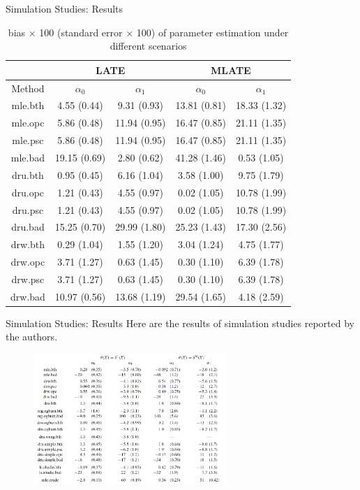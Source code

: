\documentclass[aspectratio=169,xcolor=dvipsnames]{beamer}
\begin{document}
\begin{frame}{Simulation Studies: Results}
\begin{table}
\footnotesize
\centering
\begin{tabular}[h]{c|cc|cc}
\toprule
    & \multicolumn{2}{c|}{LATE} &\multicolumn{2}{c}{MLATE}\\
\midrule
    Method & $\alpha_0$ & $\alpha_1$ & $\alpha_0$ & $\alpha_1$\\
\midrule
    mle.bth&4.55 (0.44) & 9.31 (0.93)&13.81 (0.81) & 18.33 (1.32)\\
    mle.opc&5.86 (0.48) & 11.94 (0.95)&16.47 (0.85) & 21.11 (1.35)\\
    mle.psc&5.86 (0.48) & 11.94 (0.95)&16.47 (0.85) & 21.11 (1.35)\\
    mle.bad&19.15 (0.69) & 2.80 (0.62)&41.28 (1.46) & 0.53 (1.05)\\
    dru.bth&0.95 (0.45) & 6.16 (1.04)&3.58 (1.00) & 9.75 (1.79)\\
    dru.opc&1.21 (0.43) & 4.55 (0.97)&0.02 (1.05) & 10.78 (1.99)\\
    dru.psc&1.21 (0.43) & 4.55 (0.97)&0.02 (1.05) & 10.78 (1.99)\\
    dru.bad&15.25 (0.70) & 29.99 (1.80)&25.23 (1.43) & 17.30 (2.56)\\
    drw.bth&0.29 (1.04) & 1.55 (1.20)&3.04 (1.24) & 4.75 (1.77)\\
    drw.opc&3.71 (1.27) & 0.63 (1.45)&0.30 (1.10) & 6.39 (1.78)\\
    drw.psc&3.71 (1.27) & 0.63 (1.45)&0.30 (1.10) & 6.39 (1.78)\\
    drw.bad&10.97 (0.56) & 13.68 (1.19)&29.54 (1.65) & 4.18 (2.59)\\
\bottomrule
\end{tabular}
\caption{bias $\times$ 100 (standard error $\times$ 100) of parameter estimation under different scenarios}
\end{table}
\end{frame}
\begin{frame}{Simulation Studies: Results}
Here are the results of simulation studies reported by the authors.

\begin{figure}
\centering
\includegraphics[width=0.65\textwidth]{figure/simulation.png}
\end{figure}
\end{frame}
\end{document}
